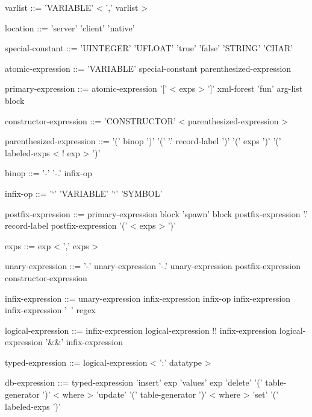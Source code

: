 \documentclass[11pt,a4paper]{article}
\begin{document}
\begin{grammar}
varlist ::= 'VARIABLE' < ',' varlist >

location ::= 'server'
             'client'
             'native'

special-constant ::= 'UINTEGER'
                     'UFLOAT'
                     'true'
                     'false'
                     'STRING'
                     'CHAR'

atomic-expression ::= 'VARIABLE'
                      special-constant
                      parenthesized-expression

primary-expression ::= atomic-expression
                       '[' < exps > ']'
                       xml-forest
                       'fun' arg-list block

constructor-expression ::= 'CONSTRUCTOR' < parenthesized-expression >

parenthesized-expression ::=  '(' binop ')'
                              '(' '.' record-label ')'
                              '(' exps ')'
                              '(' labeled-exps < ! exp > ')'

binop ::= '-'
          '-.'
          infix-op

infix-op ::=  '`' 'VARIABLE' '`'
              'SYMBOL'

postfix-expression ::=  primary-expression
                        block
                        'spawn' block
                        postfix-expression '.' record-label
                        postfix-expression '(' < exps > ')'

exps ::= exp < ',' exps > 

unary-expression ::= '-' unary-expression
                     '-.' unary-expression
                     postfix-expression
                     constructor-expression

infix-expression ::= unary-expression
                     infix-expression infix-op infix-expression
                     infix-expression '~' regex

logical-expression ::= infix-expression
                       logical-expression !! infix-expression
                       logical-expression '&&' infix-expression
        
typed-expression ::= logical-expression < ':' datatype >

db-expression ::= typed-expression
                  'insert' exp 'values' exp
                  'delete' '(' table-generator ')' < where > 
                  'update' '(' table-generator ')' < where > 'set' '(' labeled-exps ')'


\end{grammar}
\end{document}
